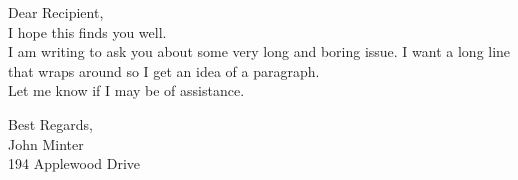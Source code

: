 \documentclass[fontsize=12pt, paper=lettter]{scrlttr2}
\begin{document}
\begin{letter}{}

Dear Recipient, \\
I hope this finds you well. \\

I am writing to ask you about some very long and boring issue. 
I want a long line that wraps around so I get an idea of a paragraph.\\

Let me know if I may be of assistance. \\


\closing{Best Regards, \\
              John Minter \\
              194 Applewood Drive} %

\end{letter}
\end{document}
